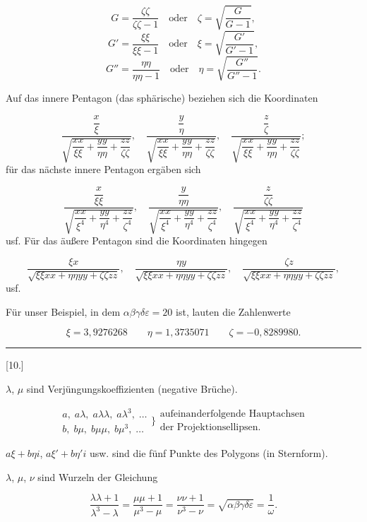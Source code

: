 \[
G = \frac{\zeta\zeta}{\zeta\zeta-1} \quad \text{oder} \quad \zeta = \sqrt{\frac{G}{G-1}},
\]
\[
G' = \frac{\xi\xi}{\xi\xi-1} \quad \text{oder} \quad \xi = \sqrt{\frac{G'}{G'-1}},
\]
\[
G'' = \frac{\eta\eta}{\eta\eta-1} \quad \text{oder} \quad \eta = \sqrt{\frac{G''}{G''-1}}.
\]

Auf das innere Pentagon (das sphärische) beziehen sich die Koordinaten

\[
\frac{\dfrac{x}{\xi}}{\sqrt{\dfrac{xx}{\xi\xi}+\dfrac{yy}{\eta\eta}+\dfrac{zz}{\zeta\zeta}}}, \quad
\frac{\dfrac{y}{\eta}}{\sqrt{\dfrac{xx}{\xi\xi}+\dfrac{yy}{\eta\eta}+\dfrac{zz}{\zeta\zeta}}}, \quad
\frac{\dfrac{z}{\zeta}}{\sqrt{\dfrac{xx}{\xi\xi}+\dfrac{yy}{\eta\eta}+\dfrac{zz}{\zeta\zeta}}};
\]
für das nächste innere Pentagon ergäben sich

\[
\frac{\dfrac{x}{\xi\xi}}{\sqrt{\dfrac{xx}{\xi^4}+\dfrac{yy}{\eta^4}+\dfrac{zz}{\zeta^4}}}, \quad
\frac{\dfrac{y}{\eta\eta}}{\sqrt{\dfrac{xx}{\xi^4}+\dfrac{yy}{\eta^4}+\dfrac{zz}{\zeta^4}}}, \quad
\frac{\dfrac{z}{\zeta\zeta}}{\sqrt{\dfrac{xx}{\xi^4}+\dfrac{yy}{\eta^4}+\dfrac{zz}{\zeta^4}}}
\]
usf. Für das äußere Pentagon sind die Koordinaten hingegen

\[
\frac{\xi x}{\sqrt{\xi\xi xx+\eta\eta yy+\zeta\zeta zz}}, \quad
\frac{\eta y}{\sqrt{\xi\xi xx+\eta\eta yy+\zeta\zeta zz}}, \quad
\frac{\zeta z}{\sqrt{\xi\xi xx+\eta\eta yy+\zeta\zeta zz}},
\]
usf.

Für unser Beispiel, in dem $\alpha\beta\gamma\delta\varepsilon = 20$ ist, lauten die Zahlenwerte

\[
\xi = 3{,}9276268 \qquad \eta = 1{,}3735071 \qquad \zeta = -0{,}8289980.
\]

\begin{center}\rule{3cm}{.4pt}\end{center}

\begin{center}[10.]\end{center}

$\lambda$, $\mu$ sind Verjüngungskoeffizienten (negative Brüche).

\[
\begin{aligned}
a,\; a\lambda,\; a\lambda\lambda,\; a\lambda^3,\; \ldots \\
b,\; b\mu,\; b\mu\mu,\; b\mu^3,\; \ldots
\end{aligned}
\Bigg\} \begin{gathered}\text{aufeinanderfolgende Hauptachsen}\\\text{der Projektionsellipsen.}\end{gathered}
\]

$a\xi+b\eta i$, $a\xi'+b\eta' i$ usw. sind die fünf Punkte des Polygons (in Sternform).

$\lambda$, $\mu$, $\nu$ sind Wurzeln der Gleichung

\[
\frac{\lambda\lambda+1}{\lambda^3-\lambda} = \frac{\mu\mu+1}{\mu^3-\mu} = \frac{\nu\nu+1}{\nu^3-\nu} = \sqrt{\alpha\beta\gamma\delta\varepsilon} = \frac{1}{\omega}.
\]
